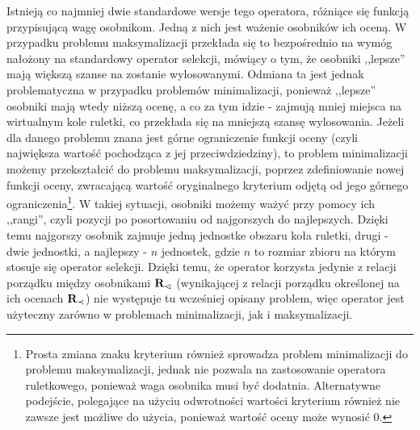 \documentclass[./FM_mgr.tex]{subfiles}
\begin{document}
Istnieją co najmniej dwie standardowe wersje tego operatora, różniące się funkcją przypisującą wagę osobnikom. 
Jedną z nich jest ważenie osobników ich oceną.
W przypadku problemu maksymalizacji przekłada się to bezpośrednio na wymóg nałożony na standardowy operator selekcji, mówiący o tym, że osobniki ,,lepsze'' mają większą szanse na zostanie wylosowanymi.
Odmiana ta jest jednak problematyczna w przypadku problemów minimalizacji, ponieważ ,,lepsze'' osobniki mają wtedy niższą ocenę, a co za tym idzie - zajmują mniej miejsca na wirtualnym kole ruletki, co przekłada się na mniejszą szansę wylosowania.
Jeżeli dla danego problemu znana jest górne ograniczenie funkcji oceny (czyli największa wartość pochodząca z jej przeciwdziedziny), to problem minimalizacji możemy przekształcić do problemu maksymalizacji, poprzez zdefiniowanie nowej funkcji oceny, zwracającą wartość oryginalnego kryterium odjętą od jego górnego ograniczenia\footnote{
	Prosta zmiana znaku kryterium również sprowadza problem minimalizacji do problemu maksymalizacji, jednak nie pozwala na zastosowanie operatora ruletkowego, ponieważ waga osobnika musi być dodatnia. 
	Alternatywne podejście, polegające na użyciu odwrotności wartości kryterium również nie zawsze jest możliwe do użycia, ponieważ wartość oceny może wynosić 0.
}.
W takiej sytuacji, osobniki możemy ważyć przy pomocy ich ,,rangi'', czyli pozycji po posortowaniu od najgorszych do najlepszych.
Dzięki temu najgorszy osobnik zajmuje jedną jednostke obszaru koła ruletki, drugi - dwie jednostki, a najlepszy - $n$ jednostek, gdzie $n$ to rozmiar zbioru na którym stosuje się operator selekcji.
Dzięki temu, że operator korzysta jedynie z relacji porządku między osobnikami ${\mathbf{R}}_{\lhd}$ (wynikającej z relacji porządku określonej na ich ocenach ${\mathbf{R}}_{\prec}$) nie występuje tu wcześniej opisany problem, więc operator jest użyteczny zarówno w problemach minimalizacji, jak i maksymalizacji.
\end{document}
